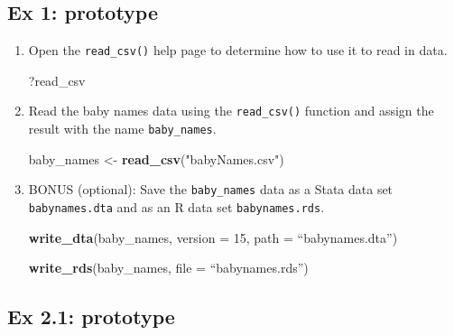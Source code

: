 \documentclass[
]{book}
\newenvironment{Shaded}{\begin{snugshade}}{\end{snugshade}}
\newcommand{\DataTypeTok}[1]{\textcolor[rgb]{0.13,0.29,0.53}{#1}}
\newcommand{\DecValTok}[1]{\textcolor[rgb]{0.00,0.00,0.81}{#1}}
\newcommand{\KeywordTok}[1]{\textcolor[rgb]{0.13,0.29,0.53}{\textbf{#1}}}
\newcommand{\NormalTok}[1]{#1}
\newcommand{\StringTok}[1]{\textcolor[rgb]{0.31,0.60,0.02}{#1}}
\begin{document}
\hypertarget{ex-1-prototype}{%
\subsection{Ex 1: prototype}\label{ex-1-prototype}}

\begin{enumerate}
\def\labelenumi{\arabic{enumi}.}
\item
  Open the \texttt{read\_csv()} help page to determine how to use it to read in data.

\begin{Shaded}
\begin{Highlighting}[]
\NormalTok{?read_csv}
\end{Highlighting}
\end{Shaded}
\item
  Read the baby names data using the \texttt{read\_csv()} function and assign the result with the name \texttt{baby\_names}.

\begin{Shaded}
\begin{Highlighting}[]
\NormalTok{baby_names <-}\StringTok{ }\KeywordTok{read_csv}\NormalTok{(}\StringTok{"babyNames.csv"}\NormalTok{)}
\end{Highlighting}
\end{Shaded}
\item
  BONUS (optional): Save the \texttt{baby\_names} data as a Stata data set \texttt{babynames.dta} and as an R data set \texttt{babynames.rds}.

\begin{Shaded}
\begin{Highlighting}[]
\KeywordTok{write_dta}\NormalTok{(baby_names, }\DataTypeTok{version =} \DecValTok{15}\NormalTok{, }\DataTypeTok{path =}\NormalTok{ “babynames.dta”)}

\KeywordTok{write_rds}\NormalTok{(baby_names, }\DataTypeTok{file =}\NormalTok{ “babynames.rds”)}
\end{Highlighting}
\end{Shaded}
\end{enumerate}

\hypertarget{ex-2.1-prototype}{%
\subsection{Ex 2.1: prototype}\label{ex-2.1-prototype}}
\end{document}
